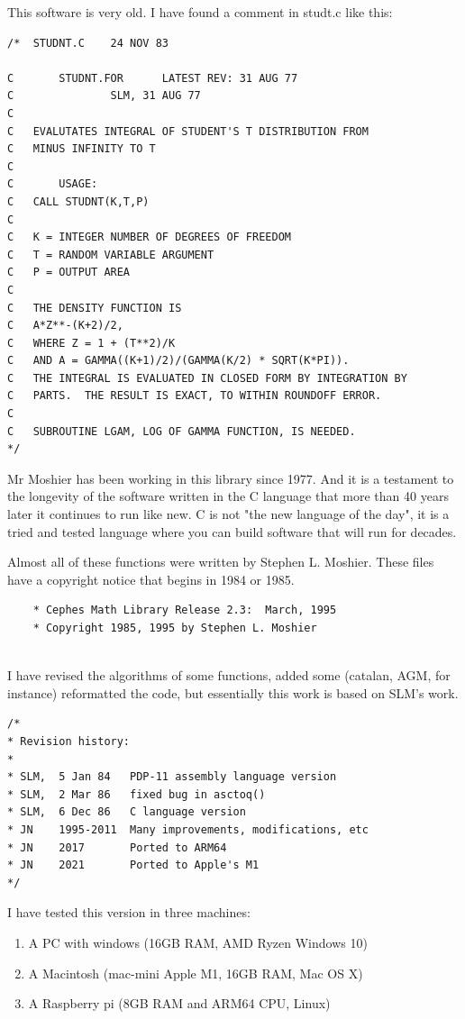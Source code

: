 \documentclass[10pt,a4paper,x11names]{memoir} %
\begin{document}
This software is very old. I have found a comment in studt.c like this:
\begin{verbatim}
/*  STUDNT.C    24 NOV 83

C       STUDNT.FOR      LATEST REV: 31 AUG 77
C               SLM, 31 AUG 77
C
C   EVALUTATES INTEGRAL OF STUDENT'S T DISTRIBUTION FROM
C   MINUS INFINITY TO T
C
C       USAGE:
C   CALL STUDNT(K,T,P)
C
C   K = INTEGER NUMBER OF DEGREES OF FREEDOM
C   T = RANDOM VARIABLE ARGUMENT
C   P = OUTPUT AREA
C
C   THE DENSITY FUNCTION IS
C   A*Z**-(K+2)/2,
C   WHERE Z = 1 + (T**2)/K
C   AND A = GAMMA((K+1)/2)/(GAMMA(K/2) * SQRT(K*PI)).
C   THE INTEGRAL IS EVALUATED IN CLOSED FORM BY INTEGRATION BY
C   PARTS.  THE RESULT IS EXACT, TO WITHIN ROUNDOFF ERROR.
C
C   SUBROUTINE LGAM, LOG OF GAMMA FUNCTION, IS NEEDED.
*/

\end{verbatim}
Mr Moshier has been working in this library since 1977. And it is a testament to the longevity of the 
software written in the C language that more than 40 years later it continues to run like new. C is not "the new language of the day", it
is a tried and tested language where you can build software that will run for decades.

Almost all of these functions were written by Stephen L. Moshier. These files have a copyright notice that begins in 1984 or 1985.
\begin{verbatim}
	* Cephes Math Library Release 2.3:  March, 1995
	* Copyright 1985, 1995 by Stephen L. Moshier
	
\end{verbatim}
I have revised the algorithms of some functions, added some (catalan, AGM, for instance) reformatted the code, but essentially this work is based on SLM's work.
\begin{verbatim}
/*
* Revision history:
*
* SLM,  5 Jan 84   PDP-11 assembly language version
* SLM,  2 Mar 86   fixed bug in asctoq()
* SLM,  6 Dec 86   C language version
* JN    1995-2011  Many improvements, modifications, etc
* JN    2017       Ported to ARM64
* JN    2021       Ported to Apple's M1
*/
\end{verbatim}
I have tested this version in three machines:
\begin{enumerate}
\item A PC with windows (16GB RAM, AMD Ryzen Windows 10) 
\item  A Macintosh (mac-mini Apple M1, 16GB RAM, Mac OS X)
\item  A Raspberry pi (8GB RAM and ARM64 CPU, Linux)
\end{enumerate}
\end{document}
